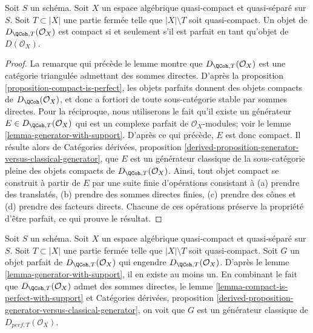 \begin{lemma}
\label{lemma-compact-is-perfect-with-support}
Soit $S$ un sch\'ema.
Soit $X$ un espace alg\'ebrique quasi-compact et quasi-s\'epar\'e sur $S$.
Soit $T \subset |X|$ une partie ferm\'ee telle que $|X| \setminus T$
soit quasi-compact. Un objet de $D_{\QCoh, T}(\mathcal{O}_X)$ est compact
si et seulement s'il est parfait en tant qu'objet de $D(\mathcal{O}_X)$.
\end{lemma}

\begin{proof}
La remarque qui pr\'ec\`ede le lemme montre que
$D_{\QCoh, T}(\mathcal{O}_X)$ est une cat\'egorie triangul\'ee
admettant des sommes directes.
D'apr\`es la proposition \ref{proposition-compact-is-perfect},
les objets parfaits donnent des objets compacts de
$D_\QCoh(\mathcal{O}_X)$, et donc a fortiori de toute sous-cat\'egorie
stable par sommes directes. Pour la r\'eciproque, nous utiliserons le fait
qu'il existe un g\'en\'erateur
$E \in D_{\QCoh, T}(\mathcal{O}_X)$ qui est un complexe parfait
de $\mathcal{O}_X$-modules; voir le
lemme \ref{lemma-generator-with-support}.
D'apr\`es ce qui pr\'ec\`ede, $E$ est donc compact. Il r\'esulte alors de
Cat\'egories d\'eriv\'ees, proposition
\ref{derived-proposition-generator-versus-classical-generator},
que $E$ est un g\'en\'erateur classique de la sous-cat\'egorie pleine
des objets compacts de $D_{\QCoh, T}(\mathcal{O}_X)$.
Ainsi, tout objet compact se construit \`a partir de $E$ par
une suite finie d'op\'erations consistant \`a
(a) prendre des translat\'es, (b) prendre des sommes directes finies,
(c) prendre des c\^ones et
(d) prendre des facteurs directs. Chacune de ces op\'erations pr\'eserve
la propri\'et\'e d'\^etre parfait, ce qui prouve le r\'esultat.
\end{proof}

\begin{remark}
\label{remark-classical-generator-with-support}
Soit $S$ un sch\'ema.
Soit $X$ un espace alg\'ebrique quasi-compact et quasi-s\'epar\'e sur $S$.
Soit $T \subset |X|$ une partie ferm\'ee telle que $|X| \setminus T$
soit quasi-compact. Soit $G$ un
objet parfait de $D_{\QCoh, T}(\mathcal{O}_X)$ qui engendre
$D_{\QCoh, T}(\mathcal{O}_X)$. D'apr\`es le lemme
\ref{lemma-generator-with-support}, il en existe au moins un. En combinant
le fait que $D_{\QCoh, T}(\mathcal{O}_X)$ admet des sommes directes, le
lemme \ref{lemma-compact-is-perfect-with-support} et
Cat\'egories d\'eriv\'ees, proposition
\ref{derived-proposition-generator-versus-classical-generator},
on voit que $G$ est un g\'en\'erateur classique de
$D_{perf, T}(\mathcal{O}_X)$.
\end{remark}

